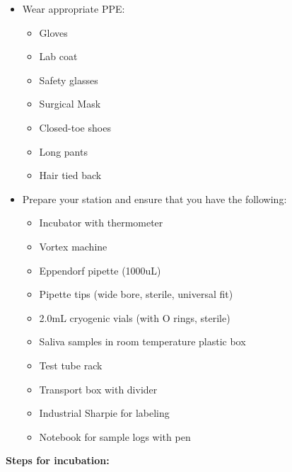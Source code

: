 \documentclass[
]{book}
\providecommand{\tightlist}{%
  \setlength{\itemsep}{0pt}\setlength{\parskip}{0pt}}
\begin{document}
\begin{itemize}
\item
  Wear appropriate PPE:

  \begin{itemize}
  \tightlist
  \item
    Gloves
  \item
    Lab coat
  \item
    Safety glasses
  \item
    Surgical Mask
  \item
    Closed-toe shoes
  \item
    Long pants
  \item
    Hair tied back
  \end{itemize}
\item
  Prepare your station and ensure that you have the following:

  \begin{itemize}
  \tightlist
  \item
    Incubator with thermometer
  \item
    Vortex machine
  \item
    Eppendorf pipette (1000uL)
  \item
    Pipette tips (wide bore, sterile, universal fit)
  \item
    2.0mL cryogenic vials (with O rings, sterile)
  \item
    Saliva samples in room temperature plastic box\\
  \item
    Test tube rack
  \item
    Transport box with divider
  \item
    Industrial Sharpie for labeling
  \item
    Notebook for sample logs with pen
  \end{itemize}
\end{itemize}

\textbf{Steps for incubation:}
\end{document}
